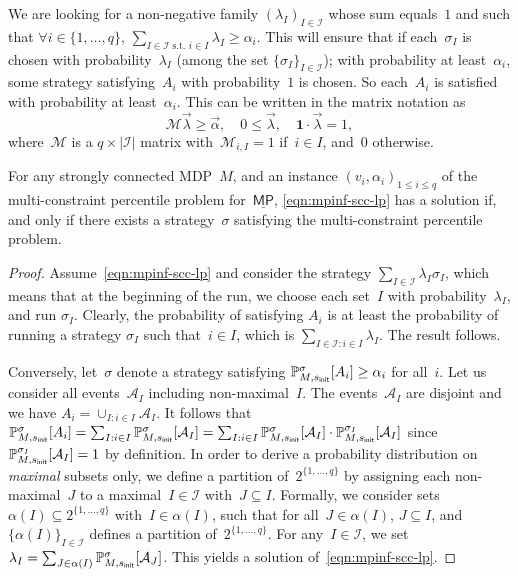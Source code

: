 \documentclass{llncs}
\newcommand{\initState}{\ensuremath{s_{{\sf init}}} }
\newcommand*{\pr}{\mathbb{P}}
\newcommand*{\mpinf}{\ensuremath{\underline{\mathsf{MP}}}}
\newcommand\calI{\ensuremath{\mathcal{I}}}
\newcommand\calA{\ensuremath{\mathcal{A}}}
\newcommand\calM{\ensuremath{\mathcal{M}}}
\begin{document}
We are looking for a non-negative family 
$(\lambda_I)_{I \in \calI}$ whose sum equals~$1$ and such that $\forall i\in\{1,\ldots,q\}$, $\sum_{I \in \calI \text{ s.t. } i \in I} \lambda_I \geq \alpha_i$.
This will ensure that if each~$\sigma_I$ is chosen with probability~$\lambda_I$ (among the set $\{\sigma_I\}_{I \in \calI}$); with probability at least~$\alpha_i$,
some strategy satisfying~$A_i$ with probability~$1$ is chosen. So each~$A_i$ is satisfied with probability at least~$\alpha_i$.
This can be written in the matrix notation as
\begin{equation}
  \label{eqn:mpinf-scc-lp}
    \calM \vec{\lambda} \geq \vec{\alpha},\quad 0\leq \vec{\lambda},\quad \mathbf{1}\cdot
		\vec{\lambda} =1,
\end{equation}
where~$\calM$ is a $q \times |\calI|$ matrix with~$\calM_{i,I} = 1$ if~$i \in I$, and~$0$ otherwise.

\begin{lemma}
  For any strongly connected MDP~$M$,
  and an instance $(v_i,\alpha_i)_{1\leq i\leq q}$ of the multi-constraint percentile problem for~$\mpinf$,
  \eqref{eqn:mpinf-scc-lp} has a solution if, and only if there exists a strategy~$\sigma$ satisfying
  the multi-constraint percentile problem.
\end{lemma}

\begin{proof}
  Assume~\eqref{eqn:mpinf-scc-lp} and consider the strategy $\sum_{I \in \calI} \lambda_I \sigma_I$, which means that
  at the beginning of the run, we choose each set~$I$ with probability~$\lambda_I$, and run
  $\sigma_I$. Clearly, the probability of satisfying $A_i$ is at least the probability of running
  a strategy $\sigma_I$ such that~$i \in I$, which is $\sum_{I \in \calI : i \in I} \lambda_I$.
  The result follows.

  Conversely, let~$\sigma$ denote a strategy satisfying $\pr_{M,\initState}^\sigma[A_i]\geq \alpha_i$ for all~$i$.
  Let us consider all events~$\calA_I$ including non-maximal~$I$.
  The events~$\calA_I$ are disjoint and we have $A_i = \cup_{I : i \in I} \calA_I$.
  It follows that $\pr_{M,\initState}^\sigma[A_i] = \sum_{I: i \in I} \pr_{M,\initState}^\sigma[\calA_I]
  = \sum_{I: i \in I}\pr_{M,\initState}^\sigma[\calA_I] \cdot \pr_{M,\initState}^{\sigma_I}[\calA_I]$
  since $\pr_{M,\initState}^{\sigma_I}[\calA_I] = 1$ by definition.
  In order to derive a probability distribution on \emph{maximal} subsets only, 
  we define a partition of~$2^{\{1,\ldots,q\}}$ by assigning each non-maximal~$J$ to a maximal~$I \in \calI$
  with~$J\subseteq I$. Formally,
  we consider sets~$\alpha(I) \subseteq 2^{\{1,\ldots,q\}}$ with~$I \in \alpha(I)$, 
   such that for all~$J \in \alpha(I)$, $J \subseteq I$, and $\{\alpha(I)\}_{I \in \calI}$ defines a partition of~$2^{\{1,\ldots,q\}}$.
  For any~$I \in \calI$, we set
  $\lambda_I = \sum_{J \in \alpha(I)} \pr_{M,\initState}^{\sigma}[\calA_J]$.
  This yields a solution of~\eqref{eqn:mpinf-scc-lp}.
\end{proof}
\end{document}
